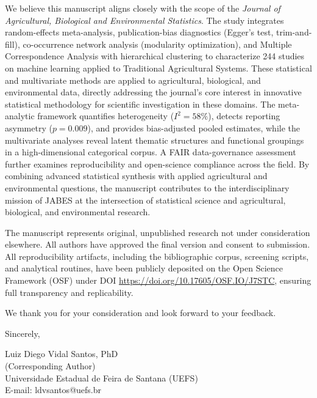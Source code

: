 \documentclass[12pt]{article}
\begin{document}
\noindent
We believe this manuscript aligns closely with the scope of the \textit{Journal of Agricultural, Biological and Environmental Statistics}. The study integrates random-effects meta-analysis, publication-bias diagnostics (Egger's test, trim-and-fill), co-occurrence network analysis (modularity optimization), and Multiple Correspondence Analysis with hierarchical clustering to characterize 244 studies on machine learning applied to Traditional Agricultural Systems. These statistical and multivariate methods are applied to agricultural, biological, and environmental data, directly addressing the journal's core interest in innovative statistical methodology for scientific investigation in these domains. The meta-analytic framework quantifies heterogeneity ($I^2 = 58\%$), detects reporting asymmetry ($p = 0.009$), and provides bias-adjusted pooled estimates, while the multivariate analyses reveal latent thematic structures and functional groupings in a high-dimensional categorical corpus. A FAIR data-governance assessment further examines reproducibility and open-science compliance across the field. By combining advanced statistical synthesis with applied agricultural and environmental questions, the manuscript contributes to the interdisciplinary mission of JABES at the intersection of statistical science and agricultural, biological, and environmental research.

\vspace{6pt}

\noindent
The manuscript represents original, unpublished research not under consideration elsewhere. All authors have approved the final version and consent to submission. All reproducibility artifacts, including the bibliographic corpus, screening scripts, and analytical routines, have been publicly deposited on the Open Science Framework (OSF) under DOI \url{https://doi.org/10.17605/OSF.IO/J7STC}, ensuring full transparency and replicability.

\vspace{6pt}

\noindent
We thank you for your consideration and look forward to your feedback.

\vspace{36pt}

\noindent
Sincerely,

\vspace{36pt}

\noindent
Luiz Diego Vidal Santos, PhD\\
(Corresponding Author)\\
Universidade Estadual de Feira de Santana (UEFS)\\
E-mail: ldvsantos@uefs.br
\end{document}
